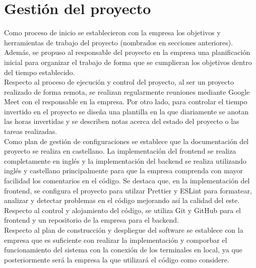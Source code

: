 \chapter{Gestión del proyecto}

Como proceso de inicio se establecieron con la empresa los objetivos y herramientas de trabajo del proyecto (nombrados en secciones anteriores). Además, se propuso al responsable del proyecto en la empresa una planificación inicial para organizar el trabajo de forma que se cumplieran los objetivos dentro del tiempo establecido. \\

Respecto al proceso de ejecución y control del proyecto, al ser un proyecto realizado de forma remota, se realizan regularmente reuniones mediante Google Meet con el responsable en la empresa. Por otro lado, para controlar el tiempo invertido en el proyecto se diseña una plantilla en la que diariamente se anotan las horas invertidas y se describen notas acerca del estado del proyecto o las tareas realizadas. \\

Como plan de gestión de configuraciones se establece que la documentación del proyecto se realiza en castellano. La implementación del frontend se realiza completamente en inglés y la implementación del backend se realiza utilizando inglés y castellano principalmente para que la empresa comprenda con mayor facilidad los comentarios en el código. Se destaca que, en la implementación del frontend, se configura el proyecto para utilzar Prettier \cite{prettier} y ESLint \cite{eslint} para formatear, analizar y detectar problemas en el código mejorando así la calidad del este. Respecto al control y alojamiento del código, se utiliza Git y GitHub para el frontend y un repositorio de la empresa para el backend. \\


Respecto al plan de construcción y despliegue del software se establece con la empresa que es suficiente con realizar la implementación y comporbar el funcionamiento del sistema con la conexión de los terminales en local, ya que posteriormente será la empresa la que utilizará el código como considere. \\

